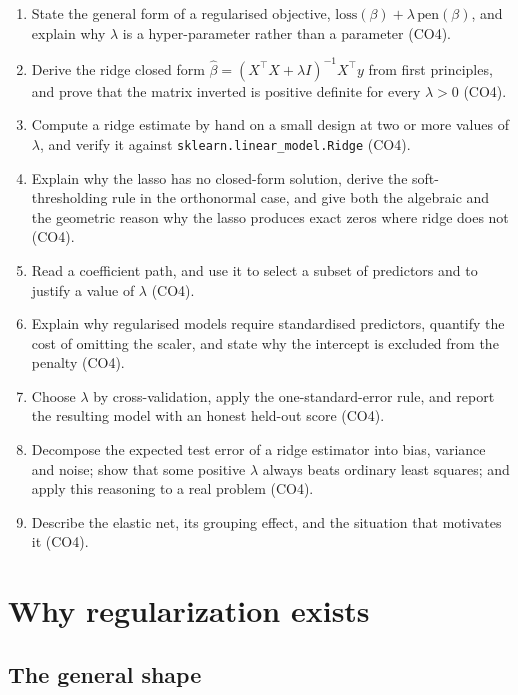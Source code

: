 \documentclass[11pt]{article}
\newcommand{\bhat}{\hat\beta}
\newcommand{\XtX}{X^{\!\top}\!X}
\newcommand{\Xty}{X^{\!\top}y}
\begin{document}
\begin{enumerate}[leftmargin=*]
  \item State the general form of a regularised objective,
    $\text{loss}(\beta) + \lambda\,\text{pen}(\beta)$, and explain why
    $\lambda$ is a hyper-parameter rather than a parameter (CO4).
  \item Derive the ridge closed form
    $\bhat = (\XtX + \lambda I)^{-1}\Xty$ from first principles, and prove
    that the matrix inverted is positive definite for every $\lambda > 0$
    (CO4).
  \item Compute a ridge estimate by hand on a small design at two or more
    values of $\lambda$, and verify it against \texttt{sklearn.linear\_model.Ridge}
    (CO4).
  \item Explain why the lasso has no closed-form solution, derive the
    soft-thresholding rule in the orthonormal case, and give both the
    algebraic and the geometric reason why the lasso produces exact zeros
    where ridge does not (CO4).
  \item Read a coefficient path, and use it to select a subset of predictors
    and to justify a value of $\lambda$ (CO4).
  \item Explain why regularised models require standardised predictors,
    quantify the cost of omitting the scaler, and state why the intercept is
    excluded from the penalty (CO4).
  \item Choose $\lambda$ by cross-validation, apply the one-standard-error
    rule, and report the resulting model with an honest held-out score (CO4).
  \item Decompose the expected test error of a ridge estimator into bias,
    variance and noise; show that some positive $\lambda$ always beats
    ordinary least squares; and apply this reasoning to a real problem (CO4).
  \item Describe the elastic net, its grouping effect, and the situation that
    motivates it (CO4).
\end{enumerate}

\section{Why regularization exists}
\label{sec:why}

\subsection{The general shape}
\end{document}
